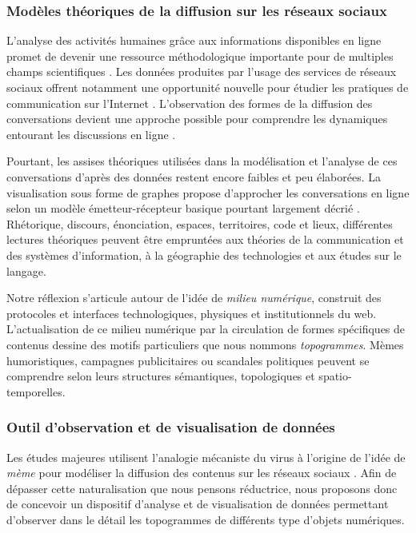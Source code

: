 \subsubsection{Modèles théoriques de la diffusion sur les réseaux sociaux}

L'analyse des activités humaines grâce aux informations disponibles en ligne promet de devenir une ressource méthodologique importante pour de multiples champs scientifiques \citep{Schreibman2007, Guichard2014}. Les données produites par l'usage des services de réseaux sociaux offrent notamment une opportunité nouvelle pour étudier les pratiques de communication sur l'Internet \citep{Zook2007,Nettleton2013,Manovich2011}. L'observation des formes de la diffusion des conversations devient une approche possible pour comprendre les dynamiques entourant les discussions en ligne \citep{Conover2013,Leetaru2013}.
 
Pourtant, les assises théoriques utilisées dans la modélisation et l'analyse de ces conversations d'après des données restent encore faibles et peu élaborées. La visualisation sous forme de graphes propose d'approcher les conversations en ligne selon un modèle émetteur-récepteur basique pourtant largement décrié \citep{Proulx2000}. Rhétorique, discours, énonciation, espaces, territoires, code et lieux, différentes lectures théoriques peuvent être empruntées aux théories de la communication et des systèmes d'information, à la géographie des technologies et aux études sur le langage.

Notre réflexion s'articule autour de l'idée de \textit{milieu numérique}, construit des protocoles et interfaces technologiques, physiques et institutionnels du web. L'actualisation de ce milieu numérique par la circulation de formes spécifiques de contenus dessine des motifs particuliers que nous nommons \textit{topogrammes}. Mèmes humoristiques, campagnes publicitaires ou scandales politiques peuvent se comprendre selon leurs structures sémantiques, topologiques et spatio-temporelles.

\subsubsection{Outil d'observation et de visualisation de données}

Les études majeures utilisent l'analogie mécaniste du virus à l'origine de l'idée de \textit{mème} \citep{Dawkins1989, Blackmore2001} pour modéliser la diffusion des contenus sur les réseaux sociaux \citep{Leskovec2005, Adamic2014}. Afin de dépasser cette naturalisation que nous pensons réductrice, nous proposons donc de concevoir un dispositif d'analyse et de visualisation de données permettant d'observer dans le détail les topogrammes de différents type d'objets numériques. 

